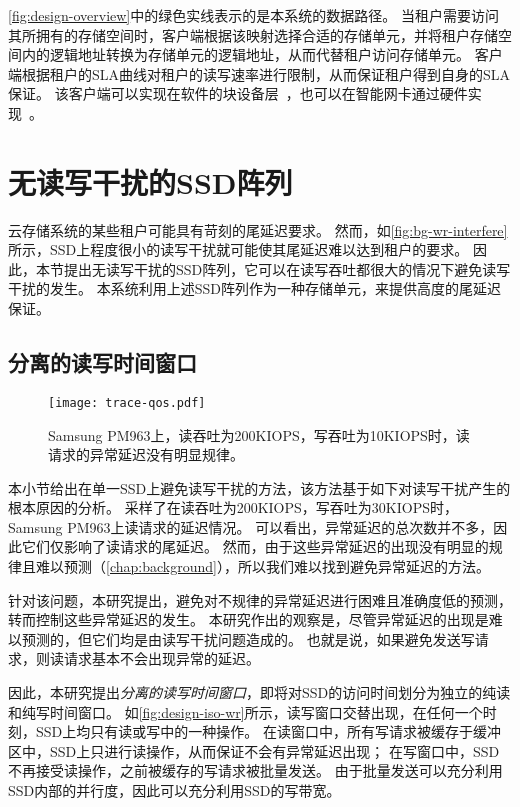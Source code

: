 \autoref{fig:design-overview}中的绿色实线表示的是本系统的数据路径。
当租户需要访问其所拥有的存储空间时，客户端根据该映射选择合适的存储单元，并将租户存储空间内的逻辑地址转换为存储单元的逻辑地址，从而代替租户访问存储单元。
客户端根据租户的SLA曲线对租户的读写速率进行限制，从而保证租户得到自身的SLA保证。
该客户端可以实现在软件的块设备层~\cite{linuxblock}，也可以在智能网卡通过硬件实现~\cite{bluefield}。

\section{无读写干扰的SSD阵列}
\label{sec:design-array}

云存储系统的某些租户可能具有苛刻的尾延迟要求。
然而，如\autoref{fig:bg-wr-interfere}所示，SSD上程度很小的读写干扰就可能使其尾延迟难以达到租户的要求。
因此，本节提出无读写干扰的SSD阵列，它可以在读写吞吐都很大的情况下避免读写干扰的发生。
本系统利用上述SSD阵列作为一种存储单元，来提供高度的尾延迟保证。

\subsection{分离的读写时间窗口}
\label{sec:design-array-isorw}

\begin{figure}[h]
  \centering
  \texttt{[image: trace-qos.pdf]}
  \caption{
        Samsung PM963上，读吞吐为200KIOPS，写吞吐为10KIOPS时，读请求的异常延迟没有明显规律。
      }
  \label{fig:design-wr-mix}
\end{figure}

本小节给出在单一SSD上避免读写干扰的方法，该方法基于如下对读写干扰产生的根本原因的分析。
采样了在读吞吐为200KIOPS，写吞吐为30KIOPS时，Samsung PM963上读请求的延迟情况。
可以看出，异常延迟的总次数并不多，因此它们仅影响了读请求的尾延迟。
然而，由于这些异常延迟的出现没有明显的规律且难以预测（\autoref{chap:background}），所以我们难以找到避免异常延迟的方法。

针对该问题，本研究提出，避免对不规律的异常延迟进行困难且准确度低的预测，转而控制这些异常延迟的发生。
本研究作出的观察是，尽管异常延迟的出现是难以预测的，但它们均是由读写干扰问题造成的。
也就是说，如果避免发送写请求，则读请求基本不会出现异常的延迟。

因此，本研究提出\textit{分离的读写时间窗口}，即将对SSD的访问时间划分为独立的纯读和纯写时间窗口。
如\autoref{fig:design-iso-wr}所示，读写窗口交替出现，在任何一个时刻，SSD上均只有读或写中的一种操作。
在读窗口中，所有写请求被缓存于缓冲区中，SSD上只进行读操作，从而保证不会有异常延迟出现；
在写窗口中，SSD不再接受读操作，之前被缓存的写请求被批量发送。
由于批量发送可以充分利用SSD内部的并行度，因此可以充分利用SSD的写带宽。

